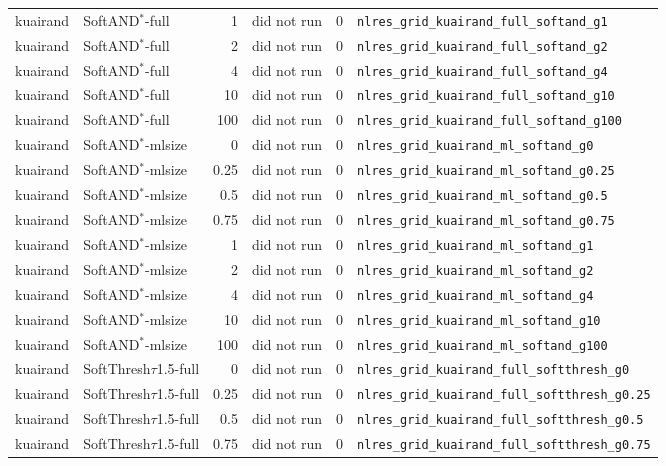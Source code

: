 \documentclass[10pt,a4paper]{article}
\begin{document}
{\begin{longtable}{llrrll}
kuairand & SoftAND$^*$-full & 1 & did not run & 0 & \texttt{nlres\_grid\_kuairand\_full\_softand\_g1} \\
kuairand & SoftAND$^*$-full & 2 & did not run & 0 & \texttt{nlres\_grid\_kuairand\_full\_softand\_g2} \\
kuairand & SoftAND$^*$-full & 4 & did not run & 0 & \texttt{nlres\_grid\_kuairand\_full\_softand\_g4} \\
kuairand & SoftAND$^*$-full & 10 & did not run & 0 & \texttt{nlres\_grid\_kuairand\_full\_softand\_g10} \\
kuairand & SoftAND$^*$-full & 100 & did not run & 0 & \texttt{nlres\_grid\_kuairand\_full\_softand\_g100} \\
kuairand & SoftAND$^*$-mlsize & 0 & did not run & 0 & \texttt{nlres\_grid\_kuairand\_ml\_softand\_g0} \\
kuairand & SoftAND$^*$-mlsize & 0.25 & did not run & 0 & \texttt{nlres\_grid\_kuairand\_ml\_softand\_g0.25} \\
kuairand & SoftAND$^*$-mlsize & 0.5 & did not run & 0 & \texttt{nlres\_grid\_kuairand\_ml\_softand\_g0.5} \\
kuairand & SoftAND$^*$-mlsize & 0.75 & did not run & 0 & \texttt{nlres\_grid\_kuairand\_ml\_softand\_g0.75} \\
kuairand & SoftAND$^*$-mlsize & 1 & did not run & 0 & \texttt{nlres\_grid\_kuairand\_ml\_softand\_g1} \\
kuairand & SoftAND$^*$-mlsize & 2 & did not run & 0 & \texttt{nlres\_grid\_kuairand\_ml\_softand\_g2} \\
kuairand & SoftAND$^*$-mlsize & 4 & did not run & 0 & \texttt{nlres\_grid\_kuairand\_ml\_softand\_g4} \\
kuairand & SoftAND$^*$-mlsize & 10 & did not run & 0 & \texttt{nlres\_grid\_kuairand\_ml\_softand\_g10} \\
kuairand & SoftAND$^*$-mlsize & 100 & did not run & 0 & \texttt{nlres\_grid\_kuairand\_ml\_softand\_g100} \\
kuairand & SoftThresh$\tau$1.5-full & 0 & did not run & 0 & \texttt{nlres\_grid\_kuairand\_full\_softthresh\_g0} \\
kuairand & SoftThresh$\tau$1.5-full & 0.25 & did not run & 0 & \texttt{nlres\_grid\_kuairand\_full\_softthresh\_g0.25} \\
kuairand & SoftThresh$\tau$1.5-full & 0.5 & did not run & 0 & \texttt{nlres\_grid\_kuairand\_full\_softthresh\_g0.5} \\
kuairand & SoftThresh$\tau$1.5-full & 0.75 & did not run & 0 & \texttt{nlres\_grid\_kuairand\_full\_softthresh\_g0.75} \\

\end{longtable}}
\end{document}
